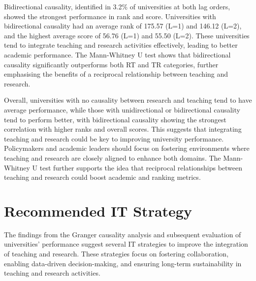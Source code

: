 \documentclass[a4paper, conference]{IEEEtran}
\begin{document}
Bidirectional causality, identified in 3.2\% of universities at both lag orders, showed the strongest performance in rank and score. Universities with bidirectional causality had an average rank of 175.57 (L=1) and 146.12 (L=2), and the highest average score of 56.76 (L=1) and 55.50 (L=2). These universities tend to integrate teaching and research activities effectively, leading to better academic performance. The Mann-Whitney U test shows that bidirectional causality significantly outperforms both RT and TR categories, further emphasising the benefits of a reciprocal relationship between teaching and research.

Overall, universities with no causality between research and teaching tend to have average performance, while those with unidirectional or bidirectional causality tend to perform better, with bidirectional causality showing the strongest correlation with higher ranks and overall scores. This suggests that integrating teaching and research could be key to improving university performance. Policymakers and academic leaders should focus on fostering environments where teaching and research are closely aligned to enhance both domains. The Mann-Whitney U test further supports the idea that reciprocal relationships between teaching and research could boost academic and ranking metrics.

\section{Recommended IT Strategy}
\label{sec:recommended_it_strategy}

The findings from the Granger causality analysis and subsequent evaluation of universities' performance suggest several IT strategies to improve the integration of teaching and research. These strategies focus on fostering collaboration, enabling data-driven decision-making, and ensuring long-term sustainability in teaching and research activities.
\end{document}
